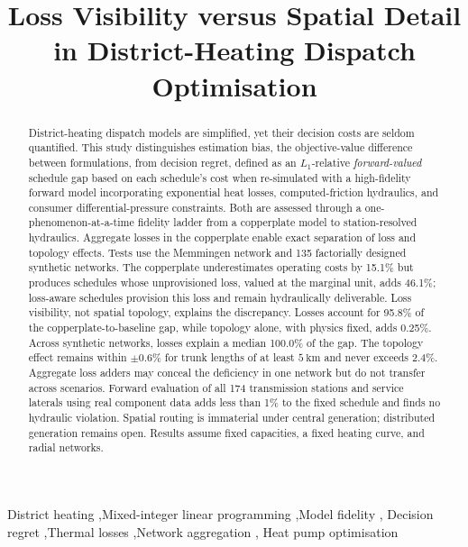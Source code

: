 \documentclass[a4paper,fleqn]{cas-sc}
\begin{document}
\title[mode=title]{%
  Loss Visibility versus Spatial Detail in District-Heating Dispatch Optimisation}

\begin{abstract}
District-heating dispatch models are simplified, yet their decision costs are
seldom quantified. This study distinguishes estimation bias, the objective-value
difference between formulations, from decision regret, defined as an
\(L_1\)-relative \emph{forward-valued} schedule gap based on each schedule's cost
when re-simulated with a high-fidelity forward model incorporating exponential
heat losses, computed-friction hydraulics, and consumer differential-pressure
constraints. Both are assessed through a one-phenomenon-at-a-time fidelity ladder
from a copperplate model to station-resolved hydraulics. Aggregate losses in the
copperplate enable exact separation of loss and topology effects. Tests use the
Memmingen network and 135 factorially designed synthetic networks. The copperplate
underestimates operating costs by 15.1\% but produces schedules whose unprovisioned
loss, valued at the marginal unit, adds 46.1\%; loss-aware schedules provision this
loss and remain hydraulically deliverable. Loss visibility, not spatial topology,
explains the discrepancy. Losses account for 95.8\% of the
copperplate-to-baseline gap, while topology alone, with physics fixed, adds 0.25\%.
Across synthetic networks, losses explain a median 100.0\% of the gap. The topology
effect remains within \(\pm 0.6\%\) for trunk lengths of at least \(5~\mathrm{km}\)
and never exceeds 2.4\%. Aggregate loss adders may conceal the deficiency in one
network but do not transfer across scenarios. Forward evaluation of all 174
transmission stations and service laterals using real component data adds less
than 1\% to the fixed schedule and finds no hydraulic violation. Spatial routing is immaterial under central generation; distributed
generation remains open. Results assume fixed capacities, a fixed heating curve,
and radial networks.
\end{abstract}

\begin{keywords}
District heating \sep Mixed-integer linear programming \sep Model fidelity \sep
Decision regret \sep Thermal losses \sep Network aggregation \sep
Heat pump optimisation
\end{keywords}



\maketitle
\end{document}
